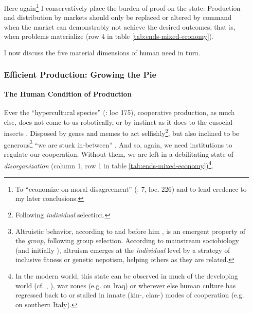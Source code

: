 Here again\footnote
	{To ``economize on moral disagreement'' (\citealt{GutmannThompson-2004-aa}: 7,  loc. 226) and to lend credence to my later conclusions.}
I conservatively place the burden of proof on the state: Production and distribution by markets should only be replaced or altered by command when the market can demonstrably not achieve the desired outcomes, that is, when problems materialize (row 4 in table \ref{tab:ends-mixed-economy}).

I now discuss the five material dimensions of human need in turn. 

\subsubsection[Efficient Production]{Efficient Production: Growing the Pie}\label{sec:production}

\paragraph{The Human Condition of Production} \label{sec:human-condition-of-production}
Ever the ``hypercultural species'' (\citealt{Henrich2007}: loc 175), cooperative production, as much else, does not come to us robotically, or by instinct as it does to the eusocial insects \citep{Wilson2012}. Disposed by genes and memes to act selfishly\footnote
	{Following \emph{individual} selection.}, 
but also inclined to be generous\footnote
	{Altruistic behavior, according to \cite{Wilson2012} and before him \cite{Darwin1859}, is an emergent property of the \emph{group}, following group selection. According to mainstream sociobiology (and initially \citealt{Wilson1975}), altruism emerges at the \emph{individual} level by a strategy of inclusive fitness or genetic nepotism, helping others as they are related.} 
``we are stuck in-between'' \citep{Lehrer2012}. And so, again, we need institutions to regulate our cooperation. Without them, we are left in a debilitating state of \emph{disorganization} (column 1, row 1 in table \ref{tab:ends-mixed-economy})\footnote
	{In the modern world, this state can be observed in much of the developing world (cf. \citealt{Clark2007}, \citealt{Easterly-2006-aa}), war zones (e.g. \citealt{Baker-IIIHamilton-2006-aa} on Iraq) or wherever else human culture has regressed back to or stalled in innate (kin-, clan-) modes of cooperation (e.g. \citealt{PutnamLeonardi-1993-aa} on southern Italy).}.

